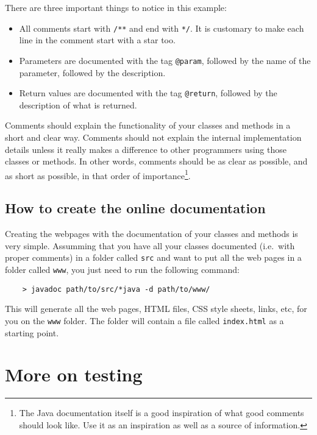 There are three important things to notice in this example: 

\begin{itemize}
\item All comments start with \verb+/**+ and end with \verb+*/+. It is
  customary to make each line in the comment start with a star too.
\item Parameters are documented with the tag \verb+@param+, followed
  by the name of the parameter, followed by the description.
\item Return values are documented with the tag \verb+@return+,
  followed by the description of what is returned. 
\end{itemize}

Comments should explain the functionality of your classes and methods
in a short and clear way. Comments should not explain the internal
implementation details unless it really makes a difference to other
programmers using those classes or methods. In other words, comments
should be as clear as possible, and as short as possible, in that
order of importance\footnote{The Java documentation itself is a good
  inspiration of what good comments should look like. Use it as an
  inspiration as well as a source of information.}. 

\subsection{How to create the online documentation}
\label{sec:how-create-online}

Creating the webpages with the documentation of your classes and
methods is very simple. Assumming that you have all your classes
documented (i.e.~with proper comments) in a folder called \verb+src+
and want to put all the web pages in a folder called \verb+www+, you
just need to run the following command: 

\begin{verbatim}
    > javadoc path/to/src/*java -d path/to/www/
\end{verbatim}

This will generate all the web pages, HTML files, CSS style sheets,
links, etc, for you on the \verb+www+ folder. The folder will contain
a file called \verb+index.html+ as a starting point. 

\section{More on testing}
\label{sec:more-testing}


